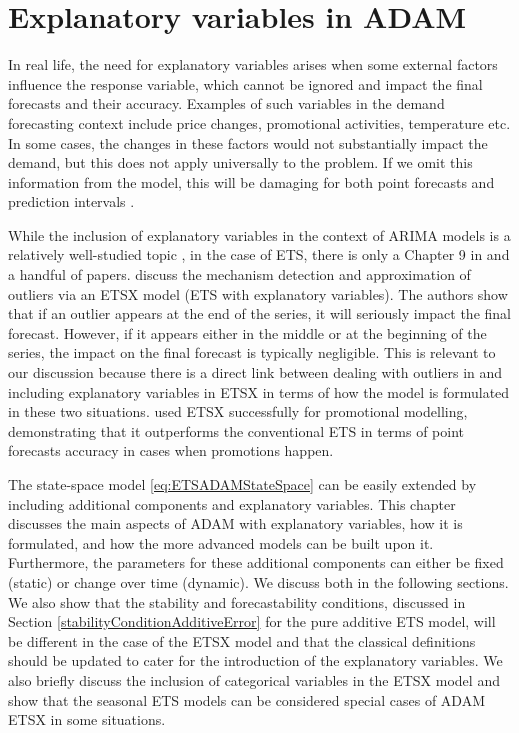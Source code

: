 \documentclass[
]{book}
\theoremstyle{definition}
\theoremstyle{definition}
\theoremstyle{definition}
\theoremstyle{definition}
\theoremstyle{remark}
\begin{document}
\hypertarget{ADAMX}{%
\chapter{Explanatory variables in ADAM}\label{ADAMX}}

In real life, the need for explanatory variables arises when some external factors influence the response variable, which cannot be ignored and impact the final forecasts and their accuracy. Examples of such variables in the demand forecasting context include price changes, promotional activities, temperature etc. In some cases, the changes in these factors would not substantially impact the demand, but this does not apply universally to the problem. If we omit this information from the model, this will be damaging for both point forecasts and prediction intervals \citep[see discussion in Chapter 12 of][]{SvetunkovSBA}.

While the inclusion of explanatory variables in the context of ARIMA models is a relatively well-studied topic \citep[for example, this was discussed by][]{Box1976}, in the case of ETS, there is only a Chapter 9 in \citet{Hyndman2008b} and a handful of papers. \citet{Koehler2012} discuss the mechanism detection and approximation of outliers via an ETSX model (ETS with explanatory variables). The authors show that if an outlier appears at the end of the series, it will seriously impact the final forecast. However, if it appears either in the middle or at the beginning of the series, the impact on the final forecast is typically negligible. This is relevant to our discussion because there is a direct link between dealing with outliers in \citet{Koehler2012} and including explanatory variables in ETSX in terms of how the model is formulated in these two situations. \citet{Kourentzes2015} used ETSX successfully for promotional modelling, demonstrating that it outperforms the conventional ETS in terms of point forecasts accuracy in cases when promotions happen.

The state-space model \eqref{eq:ETSADAMStateSpace} can be easily extended by including additional components and explanatory variables. This chapter discusses the main aspects of ADAM with explanatory variables, how it is formulated, and how the more advanced models can be built upon it. Furthermore, the parameters for these additional components can either be fixed (static) or change over time (dynamic). We discuss both in the following sections. We also show that the stability and forecastability conditions, discussed in Section \ref{stabilityConditionAdditiveError} for the pure additive ETS model, will be different in the case of the ETSX model and that the classical definitions should be updated to cater for the introduction of the explanatory variables. We also briefly discuss the inclusion of categorical variables in the ETSX model and show that the seasonal ETS models can be considered special cases of ADAM ETSX in some situations.
\end{document}

